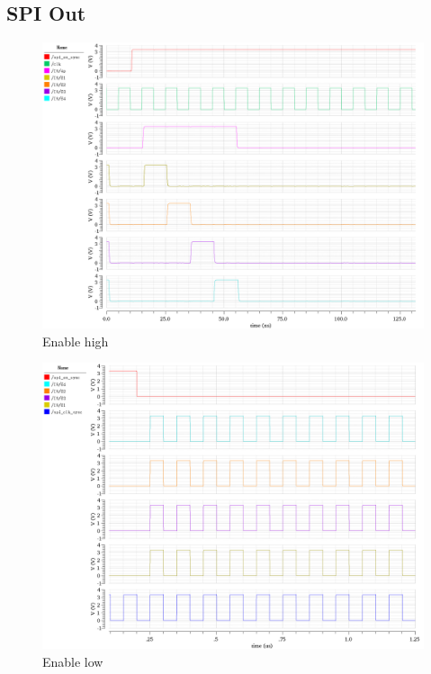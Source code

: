 \subsection{SPI Out}

\begin{figure}[H]
  \centering
  \captionsetup{justification=centering}
  \includegraphics[angle=0, scale=0.55]{../figures/spi_out_control}
  \caption{Enable high} \label{fig:spi_out1}
\end{figure}

\begin{figure}[H]
  \centering
  \captionsetup{justification=centering}
  \includegraphics[angle=0, scale=0.55]{../figures/spi_out_control2}
  \caption{Enable low} \label{fig:spi_out2}
\end{figure}

